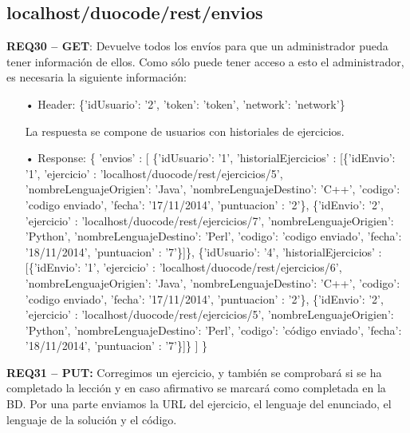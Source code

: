 \subsection{localhost/duocode/rest/envios}
\textbf{REQ30 – GET}: Devuelve todos los envíos para que un administrador pueda tener información de ellos. Como sólo puede tener acceso a esto el administrador, es necesaria la siguiente información:

\begin{itemize}
\item[•]
Header: 
\{'idUsuario': '2', 'token': 'token', 'network': 'network'\}
\vspace{1em}

La respuesta se compone de usuarios con historiales de ejercicios.

\item[•]
Response: \{ 'envios' : [ \{'idUsuario': '1', 'historialEjercicios' : [\{'idEnvio': '1', 'ejercicio' : 'localhost/duocode/rest/ejercicios/5', 'nombreLenguajeOrigien': 'Java', 'nombreLenguajeDestino': 'C++', 'codigo': 'codigo enviado', 'fecha': '17/11/2014', 'puntuacion' : '2'\}, \{'idEnvio': '2', 'ejercicio' : 'localhost/duocode/rest/ejercicios/7', 'nombreLenguajeOrigien': 'Python', 'nombreLenguajeDestino': 'Perl', 'codigo': 'codigo enviado', 'fecha': '18/11/2014', 'puntuacion' : '7'\}]\},
\{'idUsuario': '4', 'historialEjercicios' : [\{'idEnvio': '1', 'ejercicio' : 'localhost/duocode/rest/ejercicios/6', 'nombreLenguajeOrigien': 'Java', 'nombreLenguajeDestino': 'C++', 'codigo': 'codigo enviado', 'fecha': '17/11/2014', 'puntuacion' : '2'\}, \{'idEnvio': '2', 'ejercicio' : 'localhost/duocode/rest/ejercicios/5', 'nombreLenguajeOrigien': 'Python', 'nombreLenguajeDestino': 'Perl', 'codigo': 'código enviado', 'fecha': '18/11/2014', 'puntuacion' : '7'\}]\} ] \}
\end{itemize}

\textbf{REQ31 – PUT:} Corregimos un ejercicio, y también se comprobará si se ha completado la lección y en caso afirmativo se marcará como completada en la BD. Por una parte enviamos la URL del ejercicio, el lenguaje del enunciado, el lenguaje de la solución y el código.

